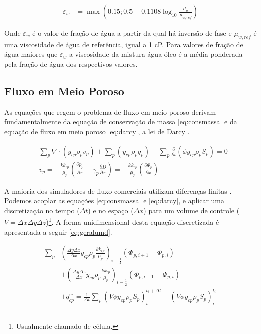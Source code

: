 \documentclass[final,5p]{elsarticle}
\numberwithin{equation}{section}
\begin{document}
        \begin{align}
            \varepsilon_w &= \max \left(0.15; 0.5 - 0.1108 \log_{10} \frac{\mu_o}{\mu_{w,ref}}\right)
        \end{align}

        Onde $\varepsilon_w$ é o valor de fração de água a partir da qual há inversão de fase e $\mu_{w,ref}$ é uma viscosidade de água de referência, igual a 1 cP. Para valores de fração de água maiores que $\varepsilon_w$ a viscosidade da mistura água-óleo é a média ponderada pela fração de água dos respectivos valores.

    \subsection{Fluxo em Meio Poroso}

        As equações que regem o problema de fluxo em meio poroso derivam fundamentalmente da equação de conservação de massa \ref{eq:consmassa} e da equação de fluxo em meio poroso \ref{eq:darcy}, a lei de Darcy \cite{dake1983fundamentals}.

        \begin{align}
            &\sum_{p} \nabla \cdot  (y_{cp} \rho_p v_p) + \sum_{p} (y_{cp} \rho_p q_p) + \sum_{p} \frac{\partial}{\partial t} \left( \phi y_{cp} \rho_p S_p\right) = 0 \label{eq:consmassa} \\
            &v_p = - \frac{k k_{rp}}{\mu_p} \left( \frac{\partial p_p}{\partial x} - \gamma_p \frac{\partial D}{\partial x} \right) = - \frac{k k_{rp}}{\mu_p} \left( \frac{\partial \Phi_p}{\partial x} \right)\label{eq:darcy}
        \end{align}

        A maioria dos simuladores de fluxo comerciais utilizam diferenças finitas \cite{computer2022cmg}\cite{schlumberger2009technical}. Podemos acoplar as equações \ref{eq:consmassa} e \ref{eq:darcy}, e aplicar uma discretização no tempo ($\Delta t$) e no espaço ($\Delta x$) para um volume de controle ($V = \Delta x \Delta y \Delta z$)\footnote{Usualmente chamado de célula.}. A forma unidimensional desta equação discretizada é apresentada a seguir \ref{eq:geralumd}.

        \begin{align}
            \sum_{p} & \left( \frac{\Delta y \Delta z}{\Delta x} y_{cp} \rho_p \frac{k k_{rp}}{\mu_p} \right)_{i+\tfrac{1}{2}} (\Phi_{p,i+1} - \Phi_{p,i})  \nonumber \\
            & + \left( \frac{\Delta y \Delta z}{\Delta x} y_{cp} \rho_p \frac{k k_{rp}}{\mu_p} \right)_{i-\tfrac{1}{2}} (\Phi_{p,i-1} - \Phi_{p,i}) \nonumber \\
            & + q_{cp}^{w} = \frac{1}{\Delta t} \sum_{p} (V \phi y_{cp} \rho_p S_p)_i^{t_i+\Delta t} - (V \phi y_{cp} \rho_p S_p)_i^{t_i} \label{eq:geralumd}
        \end{align}
\end{document}
